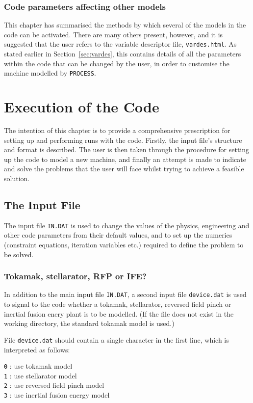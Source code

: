 \documentclass[11pt,a4paper]{report}
\newcommand{\process}{\mbox{\texttt{PROCESS}}}
\newcommand{\setheader}[1]
 {\markright{\rlap{\lower0.8ex\hbox to\textwidth{\hrulefill}}{\bf#1}}}
\newcommand{\mychapter}[1]{\small\normalsize
 \setcounter{footnote}{0}
 \chapter{#1}
 \pagestyle{myheadings}
 \setheader{Chapter \thechapter\hspace{0.8em}#1}}
\begin{document}
\subsection{Code parameters affecting other models}

This chapter has summarised the methods by which several of the models in the
code can be activated. There are many others present, however, and it is
suggested that the user refers to the variable descriptor file,
\texttt{vardes.html}. As stated earlier in Section~\ref{sec:vardes}, this
contains details of all the parameters within the code that can be changed by
the user, in order to customise the machine modelled by \process.


\mychapter{Execution of the Code}
\label{chap:run}

The intention of this chapter is to provide a comprehensive prescription for
setting up and performing runs with the code.  Firstly, the input file's
structure and format is described. The user is then taken through the
procedure for setting up the code to model a new machine, and finally an
attempt is made to indicate and solve the problems that the user will face
whilst trying to achieve a feasible solution.

\section{The Input File}
\label{sec:infile}

The input file \texttt{IN.DAT} is used to change the values of the physics,
engineering and other code parameters from their default values, and to set up
the numerics (constraint equations, iteration variables etc.) required to
define the problem to be solved.

\subsection{Tokamak, stellarator, RFP or IFE?}
\label{sec:device}

In addition to the main input file \texttt{IN.DAT}, a second input file
\texttt{device.dat} is used to signal to the code whether a tokamak,
stellarator, reversed field pinch or inertial fusion enery plant is to be
modelled. (If the file does not exist in the working directory, the standard
tokamak model is used.)

File \texttt{device.dat} should contain a single character in the first
line, which is interpreted as follows:
\begin{tabbing}
\hspace{15mm}\= \texttt{0} : use tokamak model \\
\> \texttt{1} : use stellarator model \\
\> \texttt{2} : use reversed field pinch model \\
\> \texttt{3} : use inertial fusion energy model
\end{tabbing}
\end{document}
